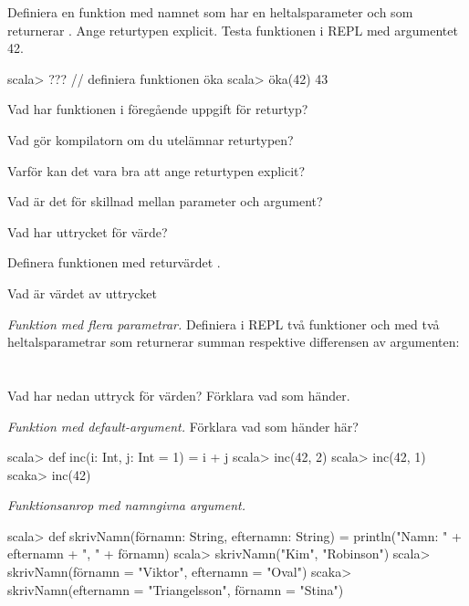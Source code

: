 \Subtask Definiera en funktion med namnet  som har en heltalsparameter  och som returnerar . Ange returtypen explicit. Testa funktionen i REPL med argumentet 42.

\begin{REPL}
scala> ???  // definiera funktionen öka
scala> öka(42)
43
\end{REPL}

\Subtask\Pen Vad har funktionen  i föregående uppgift för returtyp?

\Subtask\Pen Vad gör kompilatorn om du utelämnar returtypen?

\Subtask\Pen Varför kan det vara bra att ange returtypen explicit?

\Subtask\Pen Vad är det för skillnad mellan parameter och argument?
 
\Subtask Vad har uttrycket  för värde?

\Subtask Definera funktionen  med returvärdet .

\Subtask Vad är värdet av uttrycket 


\Task \emph{Funktion med flera parametrar.} Definiera i REPL två funktioner  och  med två heltalsparametrar som returnerar summan respektive differensen av argumenten: \\
 \\
 \\
Vad har nedan uttryck för värden? Förklara vad som händer.

\Subtask {}

\Subtask {}

\Subtask {}

\Subtask {}

\Task \emph{Funktion med default-argument.} Förklara vad som händer här?
\begin{REPL}
scala> def inc(i: Int, j: Int = 1) = i + j
scala> inc(42, 2)
scala> inc(42, 1)
scaka> inc(42)
\end{REPL}

\Task \emph{Funktionsanrop med namngivna argument.} 
\begin{REPL}
scala> def skrivNamn(förnamn: String, efternamn: String) = 
         println("Namn: " + efternamn + ", " + förnamn)
scala> skrivNamn("Kim", "Robinson")
scala> skrivNamn(förnamn = "Viktor", efternamn = "Oval")
scaka> skrivNamn(efternamn = "Triangelsson", förnamn = "Stina")
\end{REPL}

